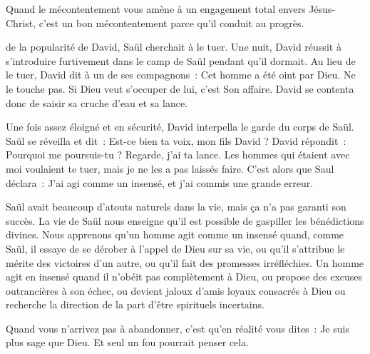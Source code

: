 Quand le mécontentement vous amène à un engagement total envers Jésus-Christ,
 c'est un bon mécontentement parce qu'il conduit au progrès. 

\dvrule






 de la popularité de David, Saül cherchait à le tuer.
 Une nuit, David réussit à s'introduire furtivement dans le camp de Saül
 pendant qu'il dormait. Au lieu de le tuer, David dit à un de ses compagnons~:
 \og Cet homme a été oint par Dieu. Ne le touche pas.
 Si Dieu veut s'occuper de lui, c'est Son affaire. \fg{}
 David se contenta donc de saisir sa cruche d'eau et sa lance.

Une fois assez éloigné et en sécurité, David interpella
 le garde du corps de Saül.
 Saül se réveilla et dit~:
 \og Est-ce bien ta voix, mon fils David ? \fg{}
 David répondit~:
 \og Pourquoi me poursuis-tu ? Regarde, j'ai ta lance.
 Les hommes qui étaient avec moi voulaient te tuer,
 mais je ne les a pas laissés faire. \fg{}
 C'est alors que Saul déclara~:
 \og J'ai agi comme un insensé, et j'ai commis une grande erreur. \fg{}

Saül avait beaucoup d'atouts naturels dans la vie,
 mais ça n'a pas garanti son succès.
 La vie de Saül nous enseigne qu'il est possible
 de gaspiller les bénédictions divines.
 Nous apprenons qu'un homme agit comme un insensé quand,
 comme Saül, il essaye de se dérober à l'appel de Dieu sur sa vie,
 ou qu'il s'attribue le mérite des victoires d'un autre,
 ou qu'il fait des promesses irréfléchies.
 Un homme agit en insensé quand il n'obéit pas complètement à Dieu,
 ou propose des excuses outrancières à son échec,
 ou devient jaloux d'amis loyaux consacrés à Dieu
 ou recherche la direction de la part d'être spirituels incertains.


Quand vous n'arrivez pas à abandonner, c'est qu'en réalité vous dites~:
 \og Je suis plus sage que Dieu. \fg{}
 Et seul un fou pourrait penser cela. 

\dvrule






